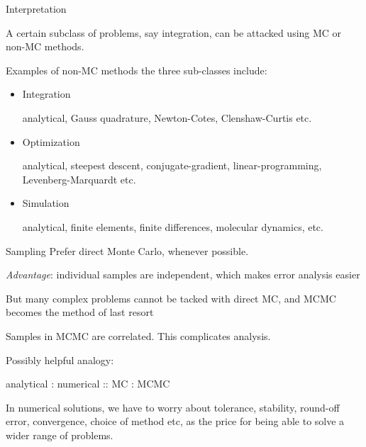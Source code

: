 \documentclass[xcolor=dvipsnames,onlymath,12pt,handout]{beamer}
\newcommand{\highlight}[1]{\textcolor{BrickRed}{#1}}
\begin{document}
\begin{frame}{Interpretation}

A certain subclass of problems, say integration, can be attacked using MC or non-MC methods.

\medskip
\pause

Examples of \highlight{non-MC methods} the three sub-classes include:

\begin{itemize}
\item \highlight{Integration}

analytical, Gauss quadrature, Newton-Cotes, Clenshaw-Curtis etc.

\pause

\item \highlight{Optimization}

analytical, steepest descent, conjugate-gradient, linear-programming, Levenberg-Marquardt etc.

\pause

\item \highlight{Simulation}

analytical, finite elements, finite differences, molecular dynamics, etc.

\end{itemize}

\end{frame}

\begin{frame}{Sampling}
Prefer direct Monte Carlo, whenever possible.

\pause
\medskip

\textit{Advantage}: individual samples are \highlight{independent}, which makes error analysis easier

\pause
\medskip

But many complex problems cannot be tacked with direct MC, and MCMC becomes the method of last resort

\pause
\medskip

Samples in MCMC are \highlight{correlated}. This complicates analysis.

\pause
\medskip

\highlight{Possibly helpful analogy}:

\begin{center}
analytical : numerical :: MC : MCMC
\end{center}

In numerical solutions, we have to worry about tolerance, stability, round-off error, convergence, choice of method etc, as the price for being able to solve a wider range of problems. 

\end{frame}

%
%
%
%
%
\end{document}
